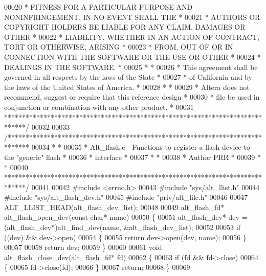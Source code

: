 \begin{DoxyCode}
00020 \textcolor{comment}{* FITNESS FOR A PARTICULAR PURPOSE AND NONINFRINGEMENT. IN NO EVENT SHALL THE *}
00021 \textcolor{comment}{* AUTHORS OR COPYRIGHT HOLDERS BE LIABLE FOR ANY CLAIM, DAMAGES OR OTHER      *}
00022 \textcolor{comment}{* LIABILITY, WHETHER IN AN ACTION OF CONTRACT, TORT OR OTHERWISE, ARISING     *}
00023 \textcolor{comment}{* FROM, OUT OF OR IN CONNECTION WITH THE SOFTWARE OR THE USE OR OTHER         *}
00024 \textcolor{comment}{* DEALINGS IN THE SOFTWARE.                                                   *}
00025 \textcolor{comment}{*                                                                             *}
00026 \textcolor{comment}{* This agreement shall be governed in all respects by the laws of the State   *}
00027 \textcolor{comment}{* of California and by the laws of the United States of America.              *}
00028 \textcolor{comment}{*                                                                             *}
00029 \textcolor{comment}{* Altera does not recommend, suggest or require that this reference design    *}
00030 \textcolor{comment}{* file be used in conjunction or combination with any other product.          *}
00031 \textcolor{comment}{******************************************************************************/}
00032 
00033 \textcolor{comment}{/******************************************************************************}
00034 \textcolor{comment}{*                                                                             *}
00035 \textcolor{comment}{* Alt\_flash.c - Functions to register a flash device to the "generic" flash   *}
00036 \textcolor{comment}{*               interface                                                     *}
00037 \textcolor{comment}{*                                                                             *}
00038 \textcolor{comment}{* Author PRR                                                                  *}
00039 \textcolor{comment}{*                                                                             *}
00040 \textcolor{comment}{******************************************************************************/}
00041 
00042 \textcolor{preprocessor}{#include <errno.h>}
00043 \textcolor{preprocessor}{#include "sys/alt_llist.h"}
00044 \textcolor{preprocessor}{#include "sys/alt_flash_dev.h"}
00045 \textcolor{preprocessor}{#include "priv/alt_file.h"}
00046 
00047 ALT_LLIST_HEAD(alt\_flash\_dev\_list);
00048 
00049 alt_flash_fd* alt_flash_open_dev(\textcolor{keyword}{const} \textcolor{keywordtype}{char}* name)
00050 \{
00051   alt_flash_dev* dev = (alt_flash_dev*)alt_find_dev(name, &alt\_flash\_dev\_list);
00052 
00053   \textcolor{keywordflow}{if} ((dev) && dev->open)
00054   \{
00055     \textcolor{keywordflow}{return} dev->open(dev, name);
00056   \}
00057 
00058   \textcolor{keywordflow}{return} dev;
00059 \}
00060 
00061 \textcolor{keywordtype}{void} alt_flash_close_dev(alt_flash_fd* fd)
00062 \{
00063   \textcolor{keywordflow}{if} (fd && fd->close)
00064   \{
00065     fd->close(fd);
00066   \}
00067   \textcolor{keywordflow}{return};
00068 \}
00069 
\end{DoxyCode}
